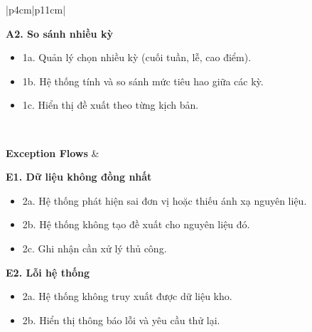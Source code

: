 \begin{longtable}{|p{4cm}|p{11cm}|}
\begin{minipage}[t]{\linewidth}
\textbf{A2. So sánh nhiều kỳ}
\begin{itemize}
\item 1a. Quản lý chọn nhiều kỳ (cuối tuần, lễ, cao điểm).
\item 1b. Hệ thống tính và so sánh mức tiêu hao giữa các kỳ.
\item 1c. Hiển thị đề xuất theo từng kịch bản.
\end{itemize}

\vspace{0.3mm}
\end{minipage}
\\ \hline

\textbf{Exception Flows} &
\begin{minipage}[t]{\linewidth}
\vspace{0.3mm}

\textbf{E1. Dữ liệu không đồng nhất}
\begin{itemize}
\item 2a. Hệ thống phát hiện sai đơn vị hoặc thiếu ánh xạ nguyên liệu.
\item 2b. Hệ thống không tạo đề xuất cho nguyên liệu đó.
\item 2c. Ghi nhận cần xử lý thủ công.
\end{itemize}

\vspace{0.3mm}

\textbf{E2. Lỗi hệ thống}
\begin{itemize}
\item 2a. Hệ thống không truy xuất được dữ liệu kho.
\item 2b. Hiển thị thông báo lỗi và yêu cầu thử lại.
\end{itemize}

\vspace{0.3mm}
\end{minipage}
\\ \hline

\end{longtable}

